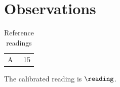 \section{Observations}
\begin{table}
\caption{Reference readings}
\label{tab:reading}
\begin{tabular}{lr}A & 15\\\end{tabular}
\end{table}
The calibrated reading is $\reading$.
